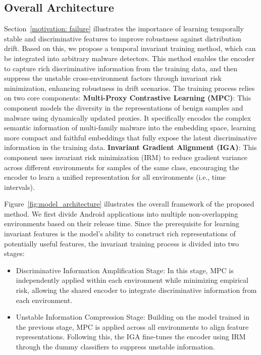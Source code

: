 \subsection{Overall Architecture}
Section~\ref{motivation: failure} illustrates the importance of learning temporally stable and discriminative features to improve robustness against distribution drift. Based on this, we propose a temporal invariant training method, which can be integrated into arbitrary malware detectors. This method enables the encoder to capture rich discriminative information from the training data, and then suppress the unstable cross-environment factors through invariant risk minimization, enhancing robustness in drift scenarios. The training process relies on two core components: \textbf{Multi-Proxy Contrastive Learning (MPC)}: This component models the diversity in the representations of benign samples and malware using dynamically updated proxies. It specifically encodes the complex semantic information of multi-family malware into the embedding space, learning more compact and faithful embeddings that fully expose the latent discriminative information in the training data. \textbf{Invariant Gradient Alignment (IGA)}: This component uses invariant risk minimization (IRM) to reduce gradient variance across different environments for samples of the same class, encouraging the encoder to learn a unified representation for all environments (i.e., time intervals).

Figure~\ref{fig:model_architecture} illustrates the overall framework of the proposed method. We first divide Android applications into multiple non-overlapping environments based on their release time. Since the prerequisite for learning invariant features is the model’s ability to construct rich representations of potentially useful features, the invariant training process is divided into two stages: 
\begin{itemize}
    \item Discriminative Information Amplification Stage: In this stage, MPC is independently applied within each environment while minimizing empirical risk, allowing the shared encoder to integrate discriminative information from each environment.
    \item Unstable Information Compression Stage: Building on the model trained in the previous stage, MPC is applied across all environments to align feature representations. Following this, the IGA fine-tunes the encoder using IRM through the dummy classifiers to suppress unstable information.
\end{itemize}


